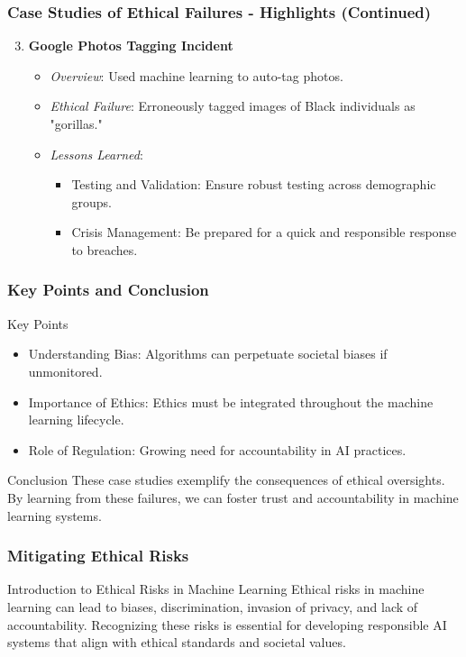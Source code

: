 \documentclass[aspectratio=169]{beamer}
\begin{document}
\begin{frame}[fragile]
    \frametitle{Case Studies of Ethical Failures - Highlights (Continued)}
    \begin{enumerate}
        \setcounter{enumi}{2} %
        \item \textbf{Google Photos Tagging Incident}
        \begin{itemize}
            \item \textit{Overview}: Used machine learning to auto-tag photos.
            \item \textit{Ethical Failure}: Erroneously tagged images of Black individuals as "gorillas."
            \item \textit{Lessons Learned}:
            \begin{itemize}
                \item Testing and Validation: Ensure robust testing across demographic groups.
                \item Crisis Management: Be prepared for a quick and responsible response to breaches.
            \end{itemize}
        \end{itemize}
    \end{enumerate}
\end{frame}

\begin{frame}[fragile]
    \frametitle{Key Points and Conclusion}
    \begin{block}{Key Points}
        \begin{itemize}
            \item Understanding Bias: Algorithms can perpetuate societal biases if unmonitored.
            \item Importance of Ethics: Ethics must be integrated throughout the machine learning lifecycle.
            \item Role of Regulation: Growing need for accountability in AI practices.
        \end{itemize}
    \end{block}
    \begin{block}{Conclusion}
        These case studies exemplify the consequences of ethical oversights. By learning from these failures, we can foster trust and accountability in machine learning systems.
    \end{block}
\end{frame}

\begin{frame}[fragile]
    \frametitle{Mitigating Ethical Risks}
    \begin{block}{Introduction to Ethical Risks in Machine Learning}
        Ethical risks in machine learning can lead to biases, discrimination, invasion of privacy, and lack of accountability. Recognizing these risks is essential for developing responsible AI systems that align with ethical standards and societal values.
    \end{block}
\end{frame}
\end{document}

